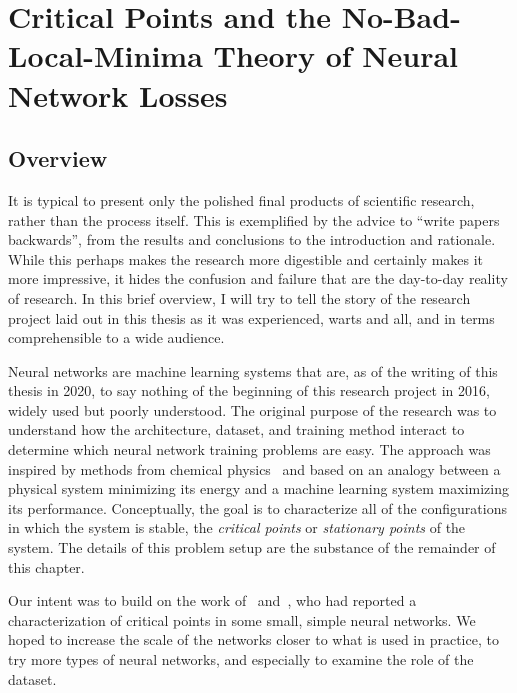 \documentclass[../../thesis.tex]{subfiles}
\begin{document}
\chapter{Critical Points and the No-Bad-Local-Minima Theory of Neural Network Losses}
\onlyinsubfile{\begin{KeepFromToc}
		\tableofcontents
		\clearpage
		\listoffigures
		\listoftables
	\end{KeepFromToc}}
\onlyinsubfile{\clearpage}

\section{Overview}

It is typical to present only the polished final
products of scientific research,
rather than the process itself.
This is exemplified by the advice to
\enquote{write papers backwards},
from the results and conclusions to the introduction and rationale.
While this perhaps makes the research more digestible and
certainly makes it more impressive,
it hides the confusion and failure
that are the day-to-day reality of research.
In this brief overview,
I will try to tell the story of the research project
laid out in this thesis as it was experienced,
warts and all,
and in terms comprehensible to a wide audience.

Neural networks are machine learning systems
that are, as of the writing of this thesis in 2020,
to say nothing of the beginning of this research project in 2016,
widely used but poorly understood.
The original purpose of the research was to
understand how the
architecture, dataset, and training method
interact to determine which neural network training problems
are easy.
The approach was inspired by methods from chemical physics~\cite{ballard2017}
and based on an analogy between a physical system minimizing its energy
and a machine learning system maximizing its performance.
Conceptually, the goal is to characterize all of the configurations
in which the system is stable,
the \emph{critical points} or \emph{stationary points}
of the system.
The details of this problem setup are the substance
of the remainder of this chapter.

Our intent was to build on the work
of~\cite{dauphin2014} and~\cite{pennington2017},
who had reported a characterization of critical points in
some small, simple neural networks.
We hoped to increase the scale of the networks
closer to what is used in practice,
to try more types of neural networks,
and especially to examine the role of the dataset.
\end{document}
